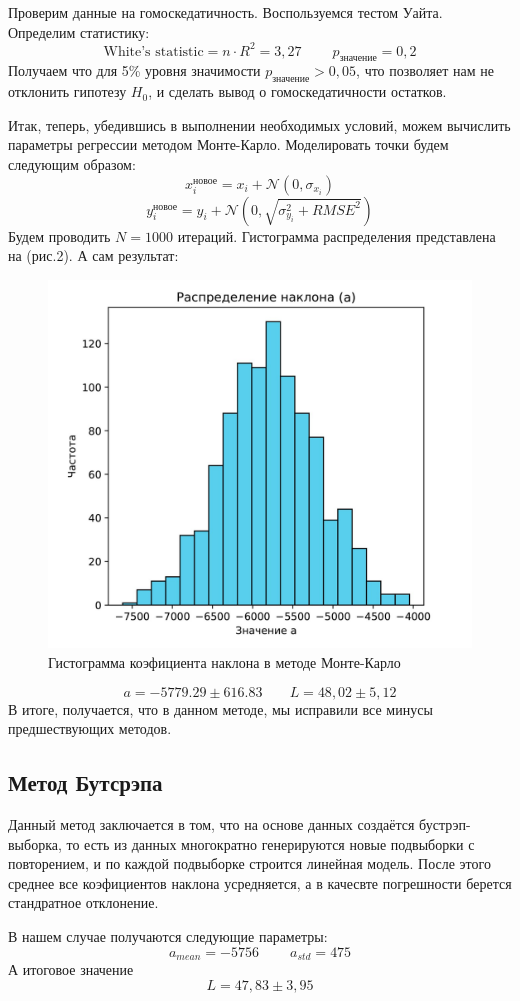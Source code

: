 \documentclass[a4paper,20pt]{article}
\theoremstyle{definition}
\begin{document}
 Проверим данные на гомоскедатичность. Воспользуемся тестом Уайта. Определим статистику:
 \begin{equation}
	\text{White's statistic} = n \cdot R^2 = 3,27 \;\;\;\;\;\;\;\; p_{\text{значение}} = 0,2
 \end{equation}
 Получаем что для 5\% уровня значимости $p_{\text{значение}} > 0,05$, что позволяет нам не отклонить гипотезу $H_0$, и сделать вывод о гомоскедатичности остатков.

 Итак, теперь, убедившись в выполнении необходимых условий, можем вычислить параметры регрессии методом Монте-Карло. Моделировать точки будем следующим образом:
 \begin{equation}
	x_i^{\text{новое}} = x_i + \mathcal{N}(0, \sigma_{x_i}) 
 \end{equation}
 \begin{equation}
	y_i^{\text{новое}} = y_i + \mathcal{N}(0, \sqrt{\sigma_{y_i}^2 + RMSE^2}) 
 \end{equation}
 Будем проводить $N = 1000$ итераций. Гистограмма распределения представлена на (рис.2). А сам результат:
 \begin{figure}[h!]
    \centering
    \includegraphics[width=0.6\linewidth]{gist_first.jpg}
    \caption{Гистограмма коэфициента наклона в методе Монте-Карло}    
\end{figure}
 \begin{equation}
	a = -5779.29 ± 616.83 \;\;\;\;\;\;\; L = 48,02 \pm 5,12
 \end{equation}
 В итоге, получается, что в данном методе, мы исправили все минусы предшествующих методов.
 \subsection{Метод Бутсрэпа}
Данный метод заключается в том, что на основе данных создаётся бустрэп-выборка, то есть из данных многократно генерируются новые подвыборки с повторением, и 
по каждой подвыборке строится линейная модель. После этого среднее все коэфициентов наклона усредняется, а в качесвте погрешности берется стандратное отклонение. \par
В нашем случае получаются следующие параметры:
\begin{equation}
	a_{mean}= -5756 \;\;\;\;\;\;\;\; a_{std} = 475
 \end{equation}
 А итоговое значение
 \begin{equation}
	L= 47,83 \pm 3,95
 \end{equation}
\end{document}
